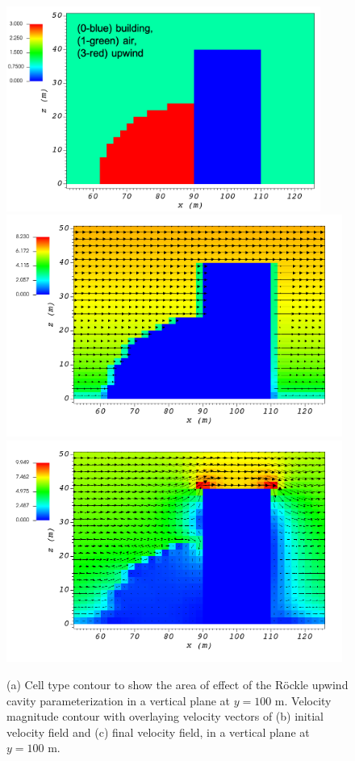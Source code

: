 \begin{figure}[H]
    \centering
    \includegraphics[width=10.3cm,keepaspectratio]{Images/upwind_y_100_1_init_icell.png}
    \includegraphics[width=11.0cm,keepaspectratio]{Images/upwind_y_100_1_init_vel.png}
    \includegraphics[width=11.0cm,keepaspectratio]{Images/upwind_y_100_1_final.png}
    \caption{(a) Cell type contour to show the area of effect of the R\"{o}ckle upwind cavity parameterization in a vertical plane at $y=100$ m. Velocity magnitude contour with overlaying velocity vectors of (b) initial velocity field and (c) final velocity field, in a vertical plane at $y=100$ m.}
\end{figure}

